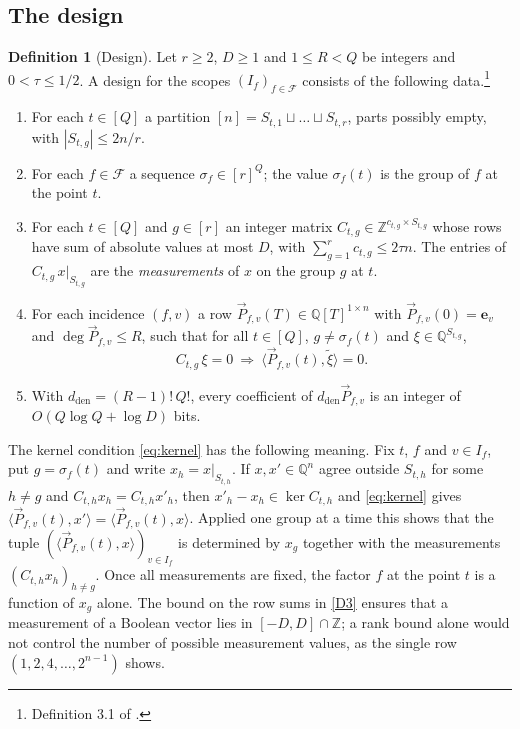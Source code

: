 \documentclass[11pt,reqno]{amsart}
\numberwithin{equation}{section}
\theoremstyle{plain}
\theoremstyle{definition}
\newtheorem{definition}[theorem]{Definition}
\theoremstyle{remark}
\newcommand{\F}{\mathcal{F}}
\newcommand{\Q}{\mathbb{Q}}
\newcommand{\Z}{\mathbb{Z}}
\newcommand{\e}{\mathbf{e}}
\newcommand{\PP}{\vec{P}}
\newcommand{\ip}[2]{\langle #1,#2\rangle}
\begin{document}
\subsection{The design}
\begin{definition}[Design]\label{def:design}
Let $r\ge2$, $D\ge1$ and $1\le R<Q$ be integers and $0<\tau\le1/2$. A design for
the scopes $(I_f)_{f\in\F}$ consists of the following data.\footnote{Definition 3.1
of \cite{OAI26}.}
\begin{enumerate}[label=(D\arabic*),leftmargin=2.8em]
\item\label{D1} For each $t\in[Q]$ a partition $[n]=S_{t,1}\sqcup\dots\sqcup S_{t,r}$, parts
possibly empty, with $|S_{t,g}|\le 2n/r$.
\item\label{D2} For each $f\in\F$ a sequence $\sigma_f\in[r]^{Q}$; the value
$\sigma_f(t)$ is the group of $f$ at the point $t$.
\item\label{D3} For each $t\in[Q]$ and $g\in[r]$ an integer matrix
$C_{t,g}\in\Z^{c_{t,g}\times S_{t,g}}$ whose rows have sum of absolute values at
most $D$, with $\sum_{g=1}^{r}c_{t,g}\le 2\tau n$. The entries of
$C_{t,g}\,x|_{S_{t,g}}$ are the \emph{measurements} of $x$ on the group $g$ at
$t$.
\item\label{D4} For each incidence $(f,v)$ a row $\PP_{f,v}(T)\in\Q[T]^{1\times n}$
with $\PP_{f,v}(0)=\e_v$ and $\deg\PP_{f,v}\le R$, such that for all $t\in[Q]$,
$g\ne\sigma_f(t)$ and $\xi\in\Q^{S_{t,g}}$,
\begin{equation}\label{eq:kernel}
  C_{t,g}\,\xi=0\ \Longrightarrow\ \ip{\PP_{f,v}(t)}{\tilde\xi}=0 .
\end{equation}
\item\label{D5} With $d_{\mathrm{den}}=(R-1)!\,Q!$, every coefficient of
$d_{\mathrm{den}}\PP_{f,v}$ is an integer of $O(Q\log Q+\log D)$ bits.
\end{enumerate}
\end{definition}

The kernel condition \eqref{eq:kernel} has the following meaning. Fix $t$, $f$
and $v\in I_f$, put $g=\sigma_f(t)$ and write $x_h=x|_{S_{t,h}}$. If $x,x'\in\Q^n$
agree outside $S_{t,h}$ for some $h\ne g$ and $C_{t,h}x_h=C_{t,h}x'_h$, then
$x'_h-x_h\in\ker C_{t,h}$ and \eqref{eq:kernel} gives
$\ip{\PP_{f,v}(t)}{x'}=\ip{\PP_{f,v}(t)}{x}$. Applied one group at a time this
shows that the tuple $(\ip{\PP_{f,v}(t)}{x})_{v\in I_f}$ is determined by $x_g$
together with the measurements $(C_{t,h}x_h)_{h\ne g}$. Once all measurements are
fixed, the factor $f$ at the point $t$ is a function of $x_g$ alone. The bound on
the row sums in \ref{D3} ensures that a measurement of a Boolean vector lies in
$[-D,D]\cap\Z$; a rank bound alone would not control the number of possible
measurement values, as the single row $(1,2,4,\dots,2^{n-1})$ shows.
\end{document}

